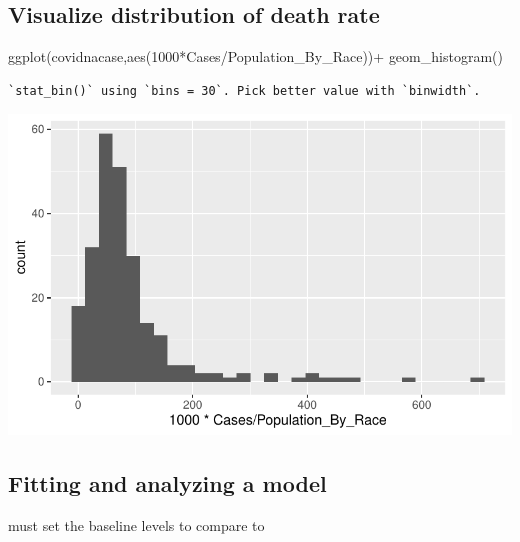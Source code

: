 \documentclass[
  letterpaper,
  DIV=11,
  numbers=noendperiod]{scrartcl}
\newenvironment{Shaded}{\begin{snugshade}}{\end{snugshade}}
\newcommand{\DecValTok}[1]{\textcolor[rgb]{0.68,0.00,0.00}{#1}}
\newcommand{\FunctionTok}[1]{\textcolor[rgb]{0.28,0.35,0.67}{#1}}
\newcommand{\NormalTok}[1]{\textcolor[rgb]{0.00,0.23,0.31}{#1}}
\newcommand{\SpecialCharTok}[1]{\textcolor[rgb]{0.37,0.37,0.37}{#1}}
\begin{document}
\subsection{Visualize distribution of death
rate}\label{visualize-distribution-of-death-rate-1}

\begin{Shaded}
\begin{Highlighting}[]
\FunctionTok{ggplot}\NormalTok{(covidnacase,}\FunctionTok{aes}\NormalTok{(}\DecValTok{1000}\SpecialCharTok{*}\NormalTok{Cases}\SpecialCharTok{/}\NormalTok{Population\_By\_Race))}\SpecialCharTok{+}
  \FunctionTok{geom\_histogram}\NormalTok{()}
\end{Highlighting}
\end{Shaded}

\begin{verbatim}
`stat_bin()` using `bins = 30`. Pick better value with `binwidth`.
\end{verbatim}

\includegraphics{StatsForFinalCSV_files/figure-pdf/unnamed-chunk-12-1.pdf}

\subsection{Fitting and analyzing a
model}\label{fitting-and-analyzing-a-model-1}

must set the baseline levels to compare to
\end{document}

